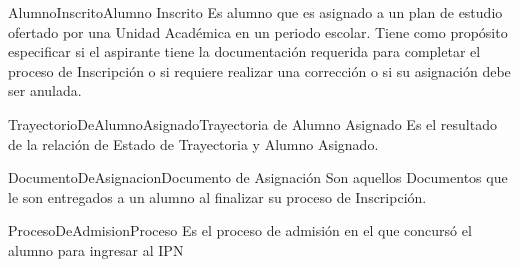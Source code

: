 \begin{cdtEntidad}{AlumnoInscrito}{Alumno Inscrito}{%
    Es alumno que es asignado a un plan de estudio ofertado por una Unidad Académica en un periodo escolar. Tiene como propósito especificar si el aspirante tiene la documentación requerida para completar el proceso de Inscripción o si requiere realizar una corrección o si su asignación debe ser anulada.}

	\cdtEntityRelSection
	
\end{cdtEntidad}


\begin{cdtEntidad}{TrayectorioDeAlumnoAsignado}{Trayectoria de Alumno Asignado}{%
    Es el resultado de la relación de Estado de Trayectoria y Alumno Asignado.}
\end{cdtEntidad}


\begin{cdtEntidad}{DocumentoDeAsignacion}{Documento de Asignación}{%
    Son aquellos Documentos que le son entregados a un alumno al finalizar su proceso de Inscripción.}
	\cdtEntityRelSection
\end{cdtEntidad}


\begin{cdtEntidad}{ProcesoDeAdmision}{Proceso}{%
    Es el proceso de admisión en el que concursó el alumno para ingresar al IPN}
\end{cdtEntidad}

